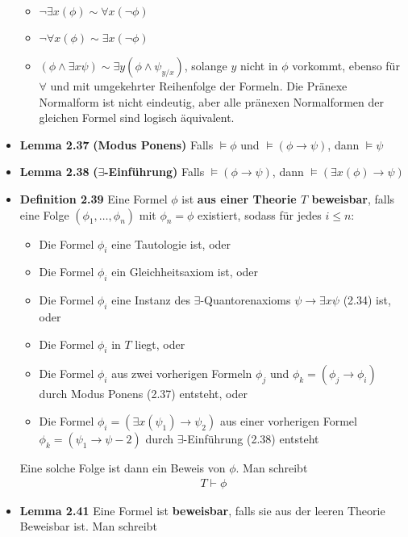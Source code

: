 \documentclass{scrartcl}
\renewcommand{\models}[0]{\vDash}
\begin{document}
\begin{itemize}
    \begin{itemize}
        \item $\neg \exists x (\phi) \sim \forall x (\neg \phi)$
        \item $\neg \forall x (\phi) \sim \exists x (\neg \phi)$
        \item $(\phi \wedge \exists x \psi) \sim \exists y (\phi \wedge \psi_{y/x})$, solange $y$ nicht in $\phi$ vorkommt, ebenso für $\forall$ und mit umgekehrter Reihenfolge der Formeln. Die Pränexe Normalform ist nicht eindeutig, aber alle pränexen Normalformen der gleichen Formel sind logisch äquivalent.
    \end{itemize}
    \item \textbf{Lemma 2.37} \textbf{(Modus Ponens)} Falls $\models \phi$ und $\models (\phi \to \psi)$, dann $\models \psi$
    \item \textbf{Lemma 2.38} \textbf{($\exists$-Einführung)} Falls $\models (\phi \to \psi)$, dann $\models (\exists x (\phi) \to \psi)$
    \item \textbf{Definition 2.39} Eine Formel $\phi$ ist \textbf{aus einer Theorie $T$ beweisbar}, falls eine Folge $(\phi_1, \hdots, \phi_n)$ mit $\phi_n = \phi$ existiert, sodass für jedes $i \leq n$:
    \begin{itemize}
        \item Die Formel $\phi_i$ eine Tautologie ist, oder
        \item Die Formel $\phi_i$ ein Gleichheitsaxiom ist, oder
        \item Die Formel $\phi_i$ eine Instanz des $\exists$-Quantorenaxioms $\psi \to \exists x \psi$ (2.34) ist, oder
        \item Die Formel $\phi_i$ in $T$ liegt, oder
        \item Die Formel $\phi_i$ aus zwei vorherigen Formeln $\phi_j$ und $\phi_k = (\phi_j \to \phi_i)$ durch Modus Ponens (2.37) entsteht, oder
        \item Die Formel $\phi_i = (\exists x (\psi_1) \to \psi_2)$ aus einer vorherigen Formel $\phi_k = (\psi_1 \to \psi-2)$ durch $\exists$-Einführung (2.38) entsteht
    \end{itemize}
    Eine solche Folge ist dann ein Beweis von $\phi$. Man schreibt
    \begin{align*}
        T \vdash \phi
    \end{align*}
    \item \textbf{Lemma 2.41} Eine Formel ist \textbf{beweisbar}, falls sie aus der leeren Theorie Beweisbar ist. Man schreibt

\end{itemize}
\end{document}
